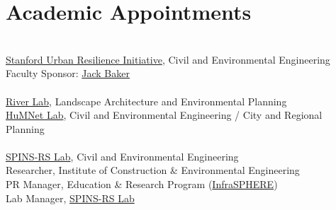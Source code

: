 \section*{Academic Appointments}
\begin{cvcontent}
    \\
    \indent \href{https://urbanresilience.stanford.edu}{Stanford Urban Resilience Initiative}, Civil and Environmental Engineering \\
    \indent Faculty Sponsor: \href{https://scholar.google.com/citations?user=im82jgIAAAAJ&hl=en}{Jack Baker}
    \\[1.5mm]
    \\
    \indent \href{http://riverlab.berkeley.edu}{River Lab}, Landscape Architecture and Environmental Planning\\
    \indent \href{http://humnetlab.berkeley.edu}{HuMNet Lab}, Civil and Environmental Engineering / City and Regional Planning
    \\[1.5mm]
    \\
    \indent \href{http://spins.snu.ac.kr}{SPINS-RS Lab}, Civil and Environmental Engineering\\
    \indent Researcher, Institute of Construction \& Environmental Engineering\\
    \indent PR Manager, Education \& Research Program (\href{https://www.bk21infrasphere.snu.ac.kr}{InfraSPHERE})\\
    \indent Lab Manager, \href{http://spins.snu.ac.kr}{SPINS-RS Lab}
\end{cvcontent}
